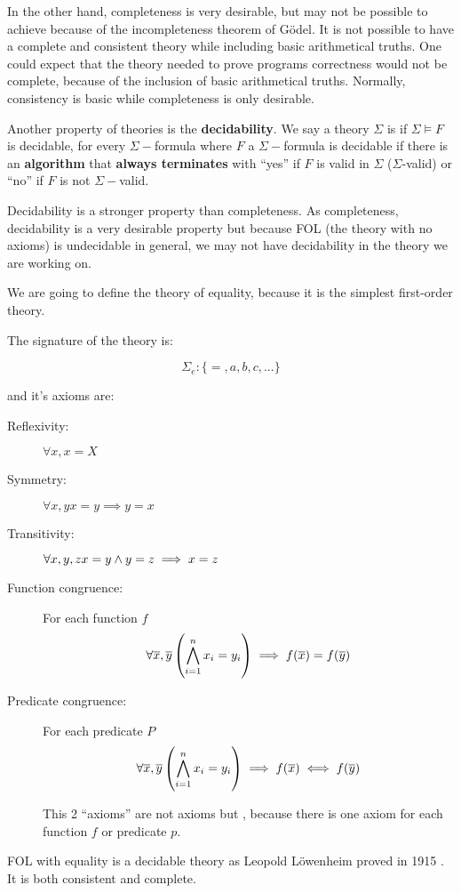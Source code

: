 In the other hand, completeness is very desirable, but may not be possible to achieve because of the incompleteness theorem of Gödel.
%
It is not possible to have a complete and consistent theory while including basic arithmetical truths. 
%
One could expect that the theory needed to prove programs correctness would not be complete, because of the inclusion of basic arithmetical truths. 
%
Normally, consistency is basic while completeness is only desirable.

Another property of theories is the \textbf{decidability}. 
%
We say a theory $\Sigma$ is  if $\Sigma \vDash F$ is decidable, for every $\Sigma-$formula 
where 
$F$ a $\Sigma-$formula is decidable if there is an \textbf{algorithm} that \textbf{always terminates} with ``yes'' if $F$ is valid in $\Sigma$ ($\Sigma$-valid) or ``no'' if $F$ is not $\Sigma-$valid.


Decidability is a stronger property than completeness. 
%
As completeness, decidability is a very desirable property but because \gls{FOL} (the theory with no axioms) is undecidable in general, we may not have decidability in the theory we are working on.



\begin{example}

\label{theory:equality}

We are going to define the theory of equality, because it is the simplest first-order theory.

The signature of the theory is:

\[\Sigma_e:\{=,a,b,c,...\}\]

and it's axioms are:

\begin{description}
	\item[Reflexivity:	] $\forall x, x=X$
	\item[Symmetry:	] $\forall x,y x=y \implies y=x$
	\item[Transitivity:	] $\forall x,y,z x=y \wedge y=z \implies x=z$
	\item[Function congruence:] For each function $f$
	\[\forall \overline{x},\overline{y} \left( \bigwedge_{i=1}^n x_i = y_i \right) \implies f(\overline{x}) = f(\overline{y})\]
	\item[Predicate congruence:]  For each predicate $P$
	\[\forall \overline{x},\overline{y} \left( \bigwedge_{i=1}^n x_i = y_i \right) \implies f(\overline{x}) \iff f(\overline{y})\]

	This 2 ``axioms'' are not axioms but , because there is one axiom for each function $f$ or predicate $p$.
\end{description}

\gls{FOL} with equality is a decidable theory as Leopold Löwenheim proved in 1915 \cite{EqualityIsDecidable}. 
%
It is both consistent and complete.
\end{example}

